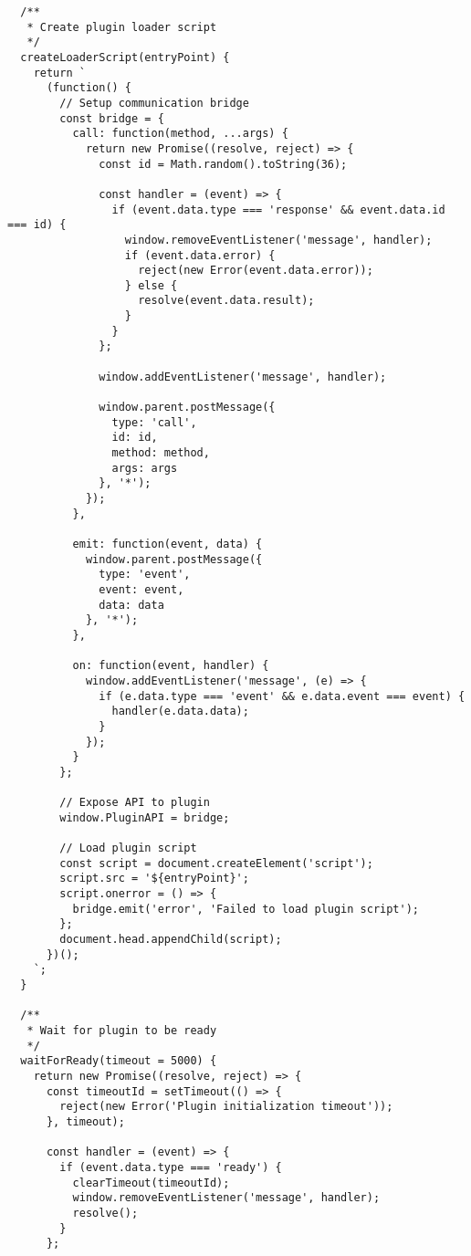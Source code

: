 \documentclass[11pt]{article}
\begin{document}
\begin{verbatim}
  /**
   * Create plugin loader script
   */
  createLoaderScript(entryPoint) {
    return `
      (function() {
        // Setup communication bridge
        const bridge = {
          call: function(method, ...args) {
            return new Promise((resolve, reject) => {
              const id = Math.random().toString(36);
              
              const handler = (event) => {
                if (event.data.type === 'response' && event.data.id === id) {
                  window.removeEventListener('message', handler);
                  if (event.data.error) {
                    reject(new Error(event.data.error));
                  } else {
                    resolve(event.data.result);
                  }
                }
              };
              
              window.addEventListener('message', handler);
              
              window.parent.postMessage({
                type: 'call',
                id: id,
                method: method,
                args: args
              }, '*');
            });
          },
          
          emit: function(event, data) {
            window.parent.postMessage({
              type: 'event',
              event: event,
              data: data
            }, '*');
          },
          
          on: function(event, handler) {
            window.addEventListener('message', (e) => {
              if (e.data.type === 'event' && e.data.event === event) {
                handler(e.data.data);
              }
            });
          }
        };
        
        // Expose API to plugin
        window.PluginAPI = bridge;
        
        // Load plugin script
        const script = document.createElement('script');
        script.src = '${entryPoint}';
        script.onerror = () => {
          bridge.emit('error', 'Failed to load plugin script');
        };
        document.head.appendChild(script);
      })();
    `;
  }
  
  /**
   * Wait for plugin to be ready
   */
  waitForReady(timeout = 5000) {
    return new Promise((resolve, reject) => {
      const timeoutId = setTimeout(() => {
        reject(new Error('Plugin initialization timeout'));
      }, timeout);
      
      const handler = (event) => {
        if (event.data.type === 'ready') {
          clearTimeout(timeoutId);
          window.removeEventListener('message', handler);
          resolve();
        }
      };
      

\end{verbatim}
\end{document}
